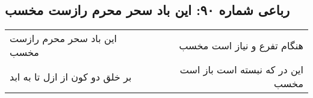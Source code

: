 \begin{center}
\section*{رباعی شماره ۹۰: این باد سحر محرم رازست مخسب}
\label{sec:0090}
\begin{longtable}{l p{0.5cm} r}
این باد سحر محرم رازست مخسب
&&
هنگام تفرع و نیاز است مخسب
\\
بر خلق دو کون از ازل تا به ابد
&&
این در که نبسته است باز است مخسب
\\
\end{longtable}
\end{center}
